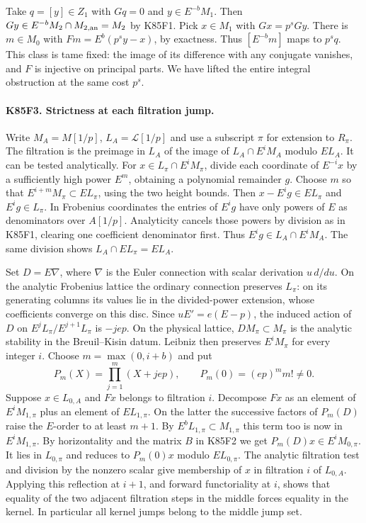 Take $q=[y]\in Z_1$ with $Gq=0$ and $y\in E^{-b}M_1$.
Then $Gy\in E^{-b}M_2\cap M_{2,\rm an}=M_2$ by K85F1.
Pick $x\in M_1$ with $Gx=p^sGy$. There is $m\in M_0$
with $Fm=E^b(p^s y-x)$, by exactness. Thus $[E^{-b}m]$ maps
to $p^s q$. This class is tame fixed: the image of its difference
with any conjugate vanishes, and $F$ is injective on principal
parts. We have lifted the entire integral obstruction at the same
cost $p^s$.

\paragraph{K85F3. Strictness at each filtration jump.}
Write $M_A=M[1/p]$, $L_A=\mathcal L[1/p]$ and use a subscript
$\pi$ for extension to $R_\pi$. The filtration is the preimage
in $L_A$ of the image of $L_A\cap E^i M_A$ modulo $EL_A$.
It can be tested analytically. For $x\in L_\pi\cap E^iM_\pi$,
divide each coordinate of $E^{-i}x$ by a sufficiently high power
$E^m$, obtaining a polynomial remainder $g$. Choose $m$ so that
$E^{i+m}M_\pi\subset EL_\pi$, using the two height bounds.
Then $x-E^ig\in EL_\pi$ and $E^ig\in L_\pi$. In Frobenius
coordinates the entries of $E^ig$ have only powers of $E$ as
denominators over $A[1/p]$. Analyticity cancels those powers by
division as in K85F1, clearing one coefficient denominator first.
Thus $E^ig\in L_A\cap E^iM_A$. The same division shows
$L_A\cap EL_\pi=EL_A$.

Set $D=E\nabla$, where $\nabla$ is the Euler connection with scalar
derivation $u\,d/du$. On the analytic Frobenius lattice the ordinary
connection preserves $L_\pi$: on its generating columns its values
lie in the divided-power extension, whose coefficients converge
on this disc. Since $uE'=e(E-p)$, the induced action of $D$ on
$E^jL_\pi/E^{j+1}L_\pi$ is $-jep$. On the physical lattice,
$DM_\pi\subset M_\pi$ is the analytic stability in the
Breuil--Kisin datum. Leibniz then preserves $E^iM_\pi$ for every
integer $i$. Choose $m=\max(0,i+b)$ and put
\[
 P_m(X)=\prod_{j=1}^m(X+jep),\qquad P_m(0)=(ep)^m m!\ne0 .
\]
Suppose $x\in L_{0,A}$ and $Fx$ belongs to filtration $i$.
Decompose $Fx$ as an element of $E^iM_{1,\pi}$ plus an element of
$EL_{1,\pi}$. On the latter the successive factors of $P_m(D)$
raise the $E$-order to at least $m+1$. By $E^bL_{1,\pi}\subset
M_{1,\pi}$ this term too is now in $E^iM_{1,\pi}$. By
horizontality and the matrix $B$ in K85F2 we get
$P_m(D)x\in E^iM_{0,\pi}$. It lies in $L_{0,\pi}$ and reduces to
$P_m(0)x$ modulo $EL_{0,\pi}$. The analytic filtration test and
division by the nonzero scalar give membership of $x$ in filtration
$i$ of $L_{0,A}$. Applying this reflection at $i+1$, and forward
functoriality at $i$, shows that equality of the two adjacent
filtration steps in the middle forces equality in the kernel.
In particular all kernel jumps belong to the middle jump set.

